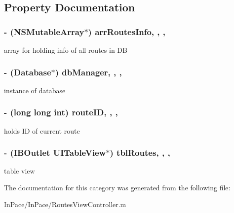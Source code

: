 \subsection{Property Documentation}
\hypertarget{categoryRoutesViewController_07_08_a87cf4ac6cc3760cb461ca9461e39664a}{
\subsubsection[{arr\-Routes\-Info}]{\setlength{\rightskip}{0pt plus 5cm}-\/ (N\-S\-Mutable\-Array$\ast$) arr\-Routes\-Info\hspace{0.3cm}{\ttfamily [read]}, {\ttfamily [write]}, {\ttfamily [nonatomic]}, {\ttfamily [strong]}}}\label{categoryRoutesViewController_07_08_a87cf4ac6cc3760cb461ca9461e39664a}
array for holding info of all routes in D\-B \hypertarget{categoryRoutesViewController_07_08_ae146a192b91c7b6f022ee584d49ef4ec}{
\subsubsection[{db\-Manager}]{\setlength{\rightskip}{0pt plus 5cm}-\/ ({\bf Database}$\ast$) db\-Manager\hspace{0.3cm}{\ttfamily [read]}, {\ttfamily [write]}, {\ttfamily [nonatomic]}, {\ttfamily [strong]}}}\label{categoryRoutesViewController_07_08_ae146a192b91c7b6f022ee584d49ef4ec}
instance of database \hypertarget{categoryRoutesViewController_07_08_a396bf5c25f2fa8ba025e328758148312}{
\subsubsection[{route\-I\-D}]{\setlength{\rightskip}{0pt plus 5cm}-\/ (long long int) route\-I\-D\hspace{0.3cm}{\ttfamily [read]}, {\ttfamily [write]}, {\ttfamily [nonatomic]}, {\ttfamily [assign]}}}\label{categoryRoutesViewController_07_08_a396bf5c25f2fa8ba025e328758148312}
holds I\-D of current route \hypertarget{categoryRoutesViewController_07_08_a07af2b2999a6ccab5e6941b36b22da85}{
\subsubsection[{tbl\-Routes}]{\setlength{\rightskip}{0pt plus 5cm}-\/ (I\-B\-Outlet U\-I\-Table\-View$\ast$) tbl\-Routes\hspace{0.3cm}{\ttfamily [read]}, {\ttfamily [write]}, {\ttfamily [nonatomic]}, {\ttfamily [weak]}}}\label{categoryRoutesViewController_07_08_a07af2b2999a6ccab5e6941b36b22da85}
table view 

The documentation for this category was generated from the following file\-:\begin{DoxyCompactItemize}
\item 
In\-Pace/\-In\-Pace/Routes\-View\-Controller.\-m\end{DoxyCompactItemize}
